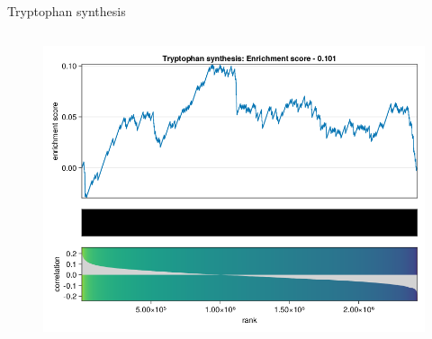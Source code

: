 \begin{frame}{Tryptophan synthesis}
    \begin{columns}[c] %

        \begin{figure}
            \includegraphics[width=1\linewidth]{../figures/fsea_Tryptophan-synthesis.png}
        \end{figure}

    \end{columns}

\end{frame}

